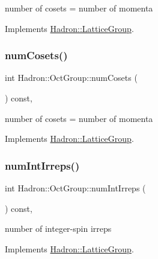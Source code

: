 number of cosets = number of momenta 

Implements \mbox{\hyperlink{structHadron_1_1LatticeGroup_afc76430f36a3a041f86d4058c59bf55e}{Hadron\+::\+Lattice\+Group}}.

\mbox{\label{structHadron_1_1OctGroup_a85ea73ed466c052783d454b14d5b30bc}} 
\subsubsection{\texorpdfstring{numCosets()}{numCosets()}\hspace{0.1cm}{\footnotesize\ttfamily [2/2]}}
{\footnotesize\ttfamily int Hadron\+::\+Oct\+Group\+::num\+Cosets (\begin{DoxyParamCaption}{ }\end{DoxyParamCaption}) const\hspace{0.3cm}{\ttfamily [inline]}, {\ttfamily [virtual]}}

number of cosets = number of momenta 

Implements \mbox{\hyperlink{structHadron_1_1LatticeGroup_afc76430f36a3a041f86d4058c59bf55e}{Hadron\+::\+Lattice\+Group}}.

\mbox{\label{structHadron_1_1OctGroup_abc0b88d4a62fb81c996b6638827cc187}} 
\subsubsection{\texorpdfstring{numIntIrreps()}{numIntIrreps()}\hspace{0.1cm}{\footnotesize\ttfamily [1/2]}}
{\footnotesize\ttfamily int Hadron\+::\+Oct\+Group\+::num\+Int\+Irreps (\begin{DoxyParamCaption}{ }\end{DoxyParamCaption}) const\hspace{0.3cm}{\ttfamily [inline]}, {\ttfamily [virtual]}}

number of integer-\/spin irreps 

Implements \mbox{\hyperlink{structHadron_1_1LatticeGroup_af2aa7b39222bf188389356eefcef7547}{Hadron\+::\+Lattice\+Group}}.

\mbox{\label{structHadron_1_1OctGroup_abc0b88d4a62fb81c996b6638827cc187}} 

